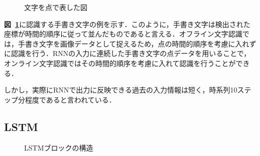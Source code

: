 \begin{figure}[tb]
 \begin{center}
  \caption{文字を点で表した図}
  \label{original}
\end{center}
\end{figure}

\textbf{図~\ref{original}}に認識する手書き文字の例を示す．このように，手書き文字は検出された座標が時間的順序に従って並んだものであると言える．オフライン文字認識では，手書き文字を画像データとして捉えるため，点の時間的順序を考慮に入れずに認識を行う．RNNの入力に連続した手書き文字の点データを用いることで，オンライン文字認識ではその時間的順序を考慮に入れて認識を行うことができる．

しかし，実際にRNNで出力に反映できる過去の入力情報は短く，時系列10ステップ分程度であると言われている\cite{okatani15:deep_learning}．

\subsection{LSTM}
\label{ssec:lstm}

\begin{figure}[tb]
 \begin{center}
  \caption{LSTMブロックの構造}
  \label{lstm}
\end{center}
\end{figure}

